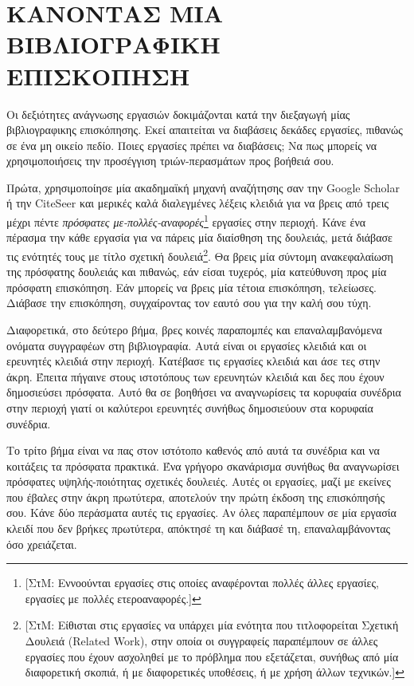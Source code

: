 \documentclass{article}
\begin{document}
\section{ΚΑΝΟΝΤΑΣ ΜΙΑ ΒΙΒΛΙΟΓΡΑΦΙΚΗ ΕΠΙΣΚΟΠΗΣΗ}
\par
Οι δεξιότητες ανάγνωσης εργασιών δοκιμάζονται κατά την διεξαγωγή μίας βιβλιογραφικης επισκόπησης. Εκεί απαιτείται να διαβάσεις δεκάδες εργασίες, πιθανώς σε ένα μη οικείο πεδίο. Ποιες εργασίες πρέπει να διαβάσεις\textlatin{;} Να πως μπορείς να χρησιμοποιήσεις την προσέγγιση τριών-περασμάτων προς βοήθειά σου.
\par
Πρώτα, χρησιμοποίησε μία ακαδημαϊκή μηχανή αναζήτησης σαν την \textlatin{Google Scholar} ή την \textlatin{CiteSeer} και μερικές καλά διαλεγμένες λέξεις κλειδιά για να βρεις από τρεις μέχρι πέντε \textit{πρόσφατες με-πολλές-αναφορές}\footnote{[ΣτΜ: Εννοούνται εργασίες στις οποίες αναφέρονται πολλές άλλες εργασίες, εργασίες με πολλές ετεροαναφορές.]} εργασίες στην περιοχή. Κάνε ένα πέρασμα την κάθε εργασία για να πάρεις μία διαίσθηση της δουλειάς, μετά διάβασε τις ενότητές τους με τίτλο σχετική δουλειά\footnote{[ΣτΜ: Είθισται στις εργασίες να υπάρχει μία ενότητα που τιτλοφορείται Σχετική Δουλειά \textlatin{(Related Work)}, στην οποία οι συγγραφείς παραπέμπουν σε άλλες εργασίες που έχουν ασχοληθεί με το πρόβλημα που εξετάζεται, συνήθως από μία διαφορετική σκοπιά, ή με διαφορετικές υποθέσεις, ή με χρήση άλλων τεχνικών.]}. Θα βρεις μία σύντομη ανακεφαλαίωση της πρόσφατης δουλειάς και πιθανώς, εάν είσαι τυχερός, μία κατεύθυνση προς μία πρόσφατη επισκόπηση. Εάν μπορείς να βρεις μία τέτοια επισκόπηση, τελείωσες. Διάβασε την επισκόπηση, συγχαίροντας τον εαυτό σου για την καλή σου τύχη.
\par
Διαφορετικά, στο δεύτερο βήμα, βρες κοινές παραπομπές και επαναλαμβανόμενα ονόματα συγγραφέων στη βιβλιογραφία. Αυτά είναι οι εργασίες κλειδιά και οι ερευνητές κλειδιά στην περιοχή. Κατέβασε τις εργασίες κλειδιά και άσε τες στην άκρη. Έπειτα πήγαινε στους ιστοτόπους των ερευνητών κλειδιά και δες που έχουν δημοσιεύσει πρόσφατα. Αυτό θα σε βοηθήσει να αναγνωρίσεις τα κορυφαία συνέδρια στην περιοχή γιατί οι καλύτεροι ερευνητές συνήθως δημοσιεύουν στα κορυφαία συνέδρια.
\par
Το τρίτο βήμα είναι να πας στον ιστότοπο καθενός από αυτά τα συνέδρια και να κοιτάξεις τα πρόσφατα πρακτικά. Ένα γρήγορο σκανάρισμα συνήθως θα αναγνωρίσει πρόσφατες υψηλής-ποιότητας σχετικές δουλειές. Αυτές οι εργασίες, μαζί με εκείνες που έβαλες στην άκρη πρωτύτερα, αποτελούν την πρώτη έκδοση της επισκόπησής σου. Κάνε δύο περάσματα αυτές τις εργασίες. Αν όλες παραπέμπουν σε μία εργασία κλειδί που δεν βρήκες πρωτύτερα, απόκτησέ τη και διάβασέ τη, επαναλαμβάνοντας όσο χρειάζεται.
\end{document}
